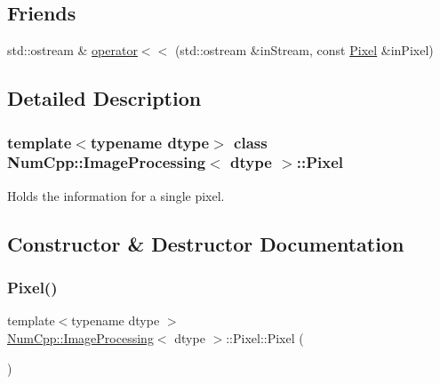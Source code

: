 \subsection*{Friends}
\begin{DoxyCompactItemize}
\item 
std\+::ostream \& \mbox{\hyperlink{class_num_cpp_1_1_image_processing_1_1_pixel_ab2651c4b29062ba3676ace1dde6ad93d}{operator$<$$<$}} (std\+::ostream \&in\+Stream, const \mbox{\hyperlink{class_num_cpp_1_1_image_processing_1_1_pixel}{Pixel}} \&in\+Pixel)
\end{DoxyCompactItemize}


\subsection{Detailed Description}
\subsubsection*{template$<$typename dtype$>$\newline
class Num\+Cpp\+::\+Image\+Processing$<$ dtype $>$\+::\+Pixel}

Holds the information for a single pixel. 

\subsection{Constructor \& Destructor Documentation}
\mbox{\label{class_num_cpp_1_1_image_processing_1_1_pixel_a320431ffebb87965df4a4f6aa749daf1}} 
\subsubsection{\texorpdfstring{Pixel()}{Pixel()}\hspace{0.1cm}{\footnotesize\ttfamily [1/2]}}
{\footnotesize\ttfamily template$<$typename dtype $>$ \\
\mbox{\hyperlink{class_num_cpp_1_1_image_processing}{Num\+Cpp\+::\+Image\+Processing}}$<$ dtype $>$\+::Pixel\+::\+Pixel (\begin{DoxyParamCaption}{ }\end{DoxyParamCaption})\hspace{0.3cm}{\ttfamily [inline]}}

